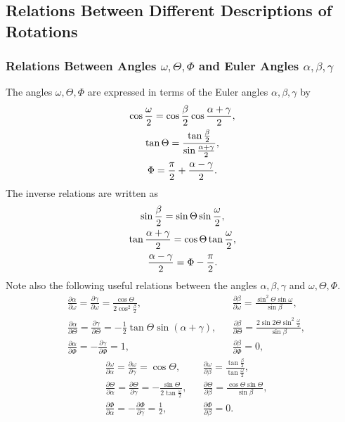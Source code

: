 \subsection{Relations Between Different Descriptions of Rotations}\label{sec:1.4.4}
\subsubsection{Relations Between Angles \(\omega, \Theta, \Phi\) and Euler Angles \(\alpha, \beta, \gamma\)}

The angles \(\omega, \Theta, \Phi\) are expressed in terms of the Euler angles \(\alpha, \beta, \gamma\) by
\begin{gather}
\cos \frac{\omega}{2}=\cos \frac{\beta}{2} \cos \frac{\alpha+\gamma}{2},  \notag\\
\tan \Theta=\frac{\tan \frac{\beta}{2}}{\sin \frac{\alpha+\gamma}{2}} , \label{eq:1:4:16}\\
\Phi=\frac{\pi}{2}+\frac{\alpha-\gamma}{2}. \notag
\end{gather}
The inverse relations are written as
\begin{gather}
\sin \frac{\beta}{2}=\sin \Theta \sin \frac{\omega}{2},  \notag\\
\tan \frac{\alpha+\gamma}{2}=\cos \Theta \tan \frac{\omega}{2} , \label{eq:1:4:17}\\
\frac{\alpha-\gamma}{2}=\Phi-\frac{\pi}{2}. \notag
\end{gather}
Note also the following useful relations between the angles \(\alpha, \beta, \gamma\) and \(\omega, \Theta, \Phi\).
\begin{equation}
\begin{aligned}
&\frac{\partial \alpha}{\partial \omega}=\frac{\partial \gamma}{\partial \omega}=\frac{\cos \Theta}{2 \cos ^{2} \frac{\beta}{2}}, && \frac{\partial \beta}{\partial \omega}=\frac{\sin ^{2} \Theta \sin \omega}{\sin \beta}, \\
&\frac{\partial \alpha}{\partial \Theta}=\frac{\partial \gamma}{\partial \Theta}=-\frac{1}{2} \tan \Theta \sin (\alpha+\gamma), && \frac{\partial \beta}{\partial \Theta}=\frac{2 \sin 2 \Theta \sin ^{2} \frac{\omega}{2}}{\sin \beta}, \\
&\frac{\partial \alpha}{\partial \Phi}=-\frac{\partial \gamma}{\partial \Phi}=1, && \frac{\partial \beta}{\partial \Phi}=0, 
\end{aligned}
\end{equation}
\begin{equation}
\begin{aligned}
&\frac{\partial \omega}{\partial \alpha}=\frac{\partial \omega}{\partial \gamma}=\cos \Theta, & &\frac{\partial \omega}{\partial \beta}=\frac{\tan \frac{\beta}{2}}{\tan \frac{\omega}{2}}, \\
&\frac{\partial \Theta}{\partial \alpha}=\frac{\partial \Theta}{\partial \gamma}=-\frac{\sin \Theta}{2 \tan \frac{\omega}{2}}, && \frac{\partial \Theta}{\partial \beta}=\frac{\cos \Theta \sin \Theta}{\sin \beta}, \\
&\frac{\partial \Phi}{\partial \alpha}=-\frac{\partial \Phi}{\partial \gamma}=\frac{1}{2}, && \frac{\partial \Phi}{\partial \beta}=0 .
\end{aligned}
\end{equation}
